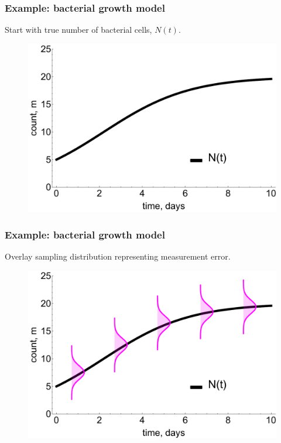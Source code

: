 \documentclass[handout]{beamer}
\begin{document}
\begin{frame}
	\frametitle{Example: bacterial growth model}
	Start with true number of bacterial cells, $N(t)$.
	
	\begin{figure}[ht]
		\centerline{\includegraphics[width=1\textwidth]{animations_figures/lec7_odeSingleBulding1.pdf}}
	\end{figure}
	
\end{frame}

\begin{frame}
	\frametitle{Example: bacterial growth model}
	Overlay sampling distribution representing measurement error.
	
	\begin{figure}[ht]
		\centerline{\includegraphics[width=1\textwidth]{animations_figures/lec7_odeSingleBulding2.pdf}}
	\end{figure}
	
\end{frame}
\end{document}
